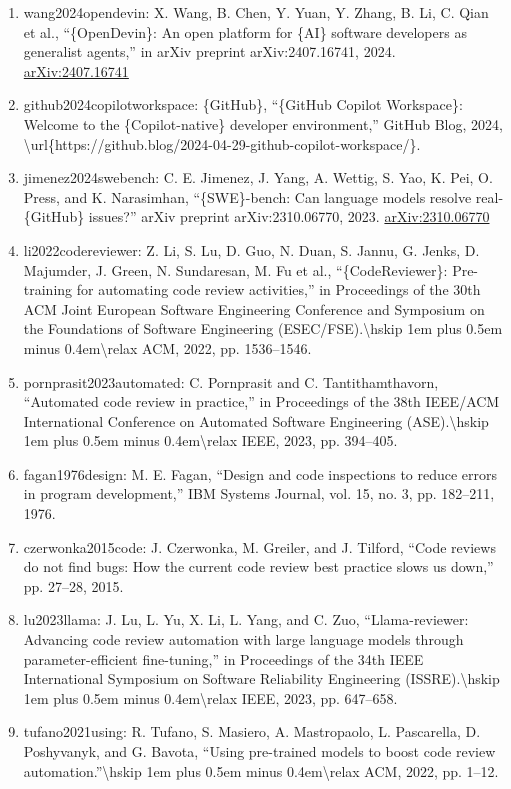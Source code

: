 \documentclass[11pt]{article}
\begin{document}
\begin{enumerate}[leftmargin=*]
  \item wang2024opendevin: X. Wang, B. Chen, Y. Yuan, Y. Zhang, B. Li, C. Qian et al., ``\{OpenDevin\}: An open platform for \{AI\} software developers as generalist agents,'' in arXiv preprint arXiv:2407.16741, 2024. \href{https://arxiv.org/abs/2407.16741}{arXiv:2407.16741}
  \item github2024copilotworkspace: \{GitHub\}, ``\{GitHub Copilot Workspace\}: Welcome to the \{Copilot-native\} developer environment,'' GitHub Blog, 2024, \textbackslash{}url\{https://github.blog/2024-04-29-github-copilot-workspace/\}.
  \item jimenez2024swebench: C. E. Jimenez, J. Yang, A. Wettig, S. Yao, K. Pei, O. Press, and K. Narasimhan, ``\{SWE\}-bench: Can language models resolve real-\{GitHub\} issues?'' arXiv preprint arXiv:2310.06770, 2023. \href{https://arxiv.org/abs/2310.06770}{arXiv:2310.06770}
  \item li2022codereviewer: Z. Li, S. Lu, D. Guo, N. Duan, S. Jannu, G. Jenks, D. Majumder, J. Green, N. Sundaresan, M. Fu et al., ``\{CodeReviewer\}: Pre-training for automating code review activities,'' in Proceedings of the 30th ACM Joint European Software Engineering Conference and Symposium on the Foundations of Software Engineering (ESEC/FSE).\textbackslash{}hskip 1em plus 0.5em minus 0.4em\textbackslash{}relax ACM, 2022, pp. 1536--1546.
  \item pornprasit2023automated: C. Pornprasit and C. Tantithamthavorn, ``Automated code review in practice,'' in Proceedings of the 38th IEEE/ACM International Conference on Automated Software Engineering (ASE).\textbackslash{}hskip 1em plus 0.5em minus 0.4em\textbackslash{}relax IEEE, 2023, pp. 394--405.
  \item fagan1976design: M. E. Fagan, ``Design and code inspections to reduce errors in program development,'' IBM Systems Journal, vol. 15, no. 3, pp. 182--211, 1976.
  \item czerwonka2015code: J. Czerwonka, M. Greiler, and J. Tilford, ``Code reviews do not find bugs: How the current code review best practice slows us down,'' pp. 27--28, 2015.
  \item lu2023llama: J. Lu, L. Yu, X. Li, L. Yang, and C. Zuo, ``Llama-reviewer: Advancing code review automation with large language models through parameter-efficient fine-tuning,'' in Proceedings of the 34th IEEE International Symposium on Software Reliability Engineering (ISSRE).\textbackslash{}hskip 1em plus 0.5em minus 0.4em\textbackslash{}relax IEEE, 2023, pp. 647--658.
  \item tufano2021using: R. Tufano, S. Masiero, A. Mastropaolo, L. Pascarella, D. Poshyvanyk, and G. Bavota, ``Using pre-trained models to boost code review automation.''\textbackslash{}hskip 1em plus 0.5em minus 0.4em\textbackslash{}relax ACM, 2022, pp. 1--12.

\end{enumerate}
\end{document}

